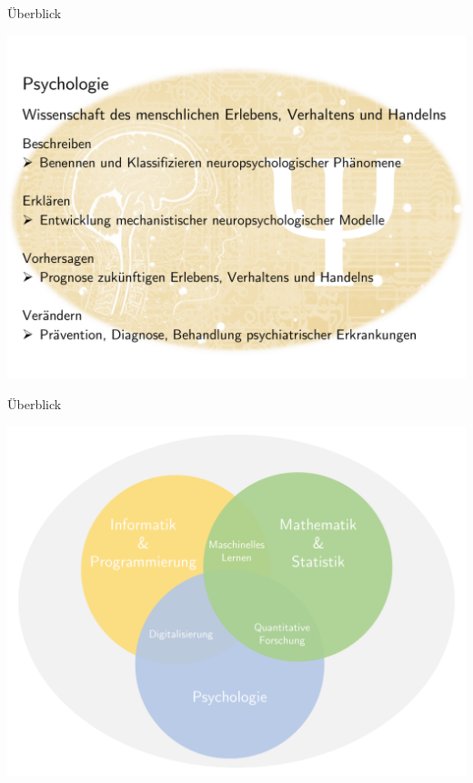 \documentclass[
  8pt,
  ignorenonframetext,
]{beamer}
\begin{document}
\begin{frame}{Überblick}
\protect\hypertarget{uxfcberblick}{}
\begin{center}\includegraphics[width=1\linewidth]{3_Abbildungen/pfm_3_psychologie} \end{center}
\end{frame}

\begin{frame}{Überblick}
\protect\hypertarget{uxfcberblick-1}{}
\begin{center}\includegraphics[width=0.9\linewidth]{3_Abbildungen/pfm_3_moderne_psychologie} \end{center}
\end{frame}
\end{document}
